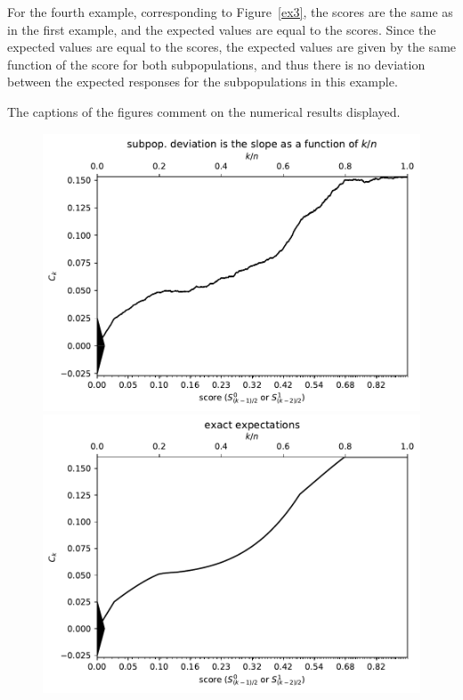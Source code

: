 \documentclass{article}
\newlength{\imsize}
\begin{document}
For the fourth example, corresponding to Figure~\ref{ex3},
the scores are the same as in the first example,
and the expected values are equal to the scores.
Since the expected values are equal to the scores, the expected values
are given by the same function of the score for both subpopulations,
and thus there is no deviation between the expected responses
for the subpopulations in this example.

The captions of the figures comment on the numerical results displayed.


\begin{figure}
\begin{centering}

\parbox{\imsize}{\includegraphics[width=\imsize]
{../codes/unweighted/10000_7000_10_1/cumulative.pdf}}
\quad\quad
\parbox{\imsize}{\includegraphics[width=\imsize]
{../codes/unweighted/10000_7000_10_1/cumulative_exact.pdf}}


\end{centering}
\end{figure}
\end{document}
